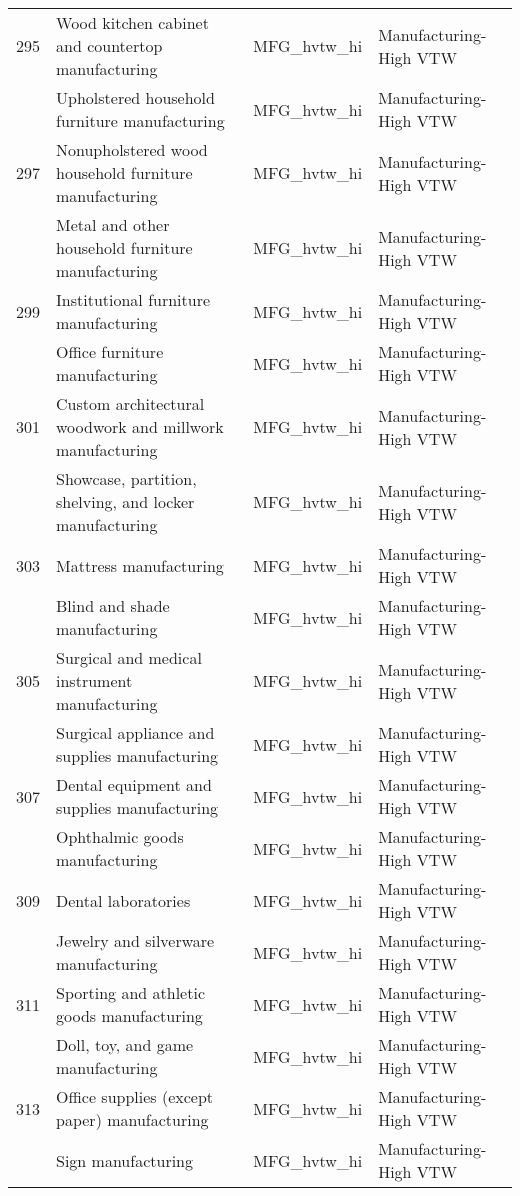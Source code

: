 \begin{landscape}
\begin{small}
\begin{longtable}{clll}
295 & Wood kitchen cabinet and countertop manufacturing & MFG\_hvtw\_hi & Manufacturing-High VTW \\
\gray 296 & Upholstered household furniture manufacturing & MFG\_hvtw\_hi & Manufacturing-High VTW \\
297 & Nonupholstered wood household furniture manufacturing & MFG\_hvtw\_hi & Manufacturing-High VTW \\
\gray 298 & Metal and other household furniture manufacturing & MFG\_hvtw\_hi & Manufacturing-High VTW \\
299 & Institutional furniture manufacturing & MFG\_hvtw\_hi & Manufacturing-High VTW \\
\gray 300 & Office furniture manufacturing & MFG\_hvtw\_hi & Manufacturing-High VTW \\
301 & Custom architectural woodwork and millwork manufacturing & MFG\_hvtw\_hi & Manufacturing-High VTW \\
\gray 302 & Showcase, partition, shelving, and locker manufacturing & MFG\_hvtw\_hi & Manufacturing-High VTW \\
303 & Mattress manufacturing & MFG\_hvtw\_hi & Manufacturing-High VTW \\
\gray 304 & Blind and shade manufacturing & MFG\_hvtw\_hi & Manufacturing-High VTW \\
305 & Surgical and medical instrument manufacturing & MFG\_hvtw\_hi & Manufacturing-High VTW \\
\gray 306 & Surgical appliance and supplies manufacturing & MFG\_hvtw\_hi & Manufacturing-High VTW \\
307 & Dental equipment and supplies manufacturing & MFG\_hvtw\_hi & Manufacturing-High VTW \\
\gray 308 & Ophthalmic goods manufacturing & MFG\_hvtw\_hi & Manufacturing-High VTW \\
309 & Dental laboratories & MFG\_hvtw\_hi & Manufacturing-High VTW \\
\gray 310 & Jewelry and silverware manufacturing & MFG\_hvtw\_hi & Manufacturing-High VTW \\
311 & Sporting and athletic goods manufacturing & MFG\_hvtw\_hi & Manufacturing-High VTW \\
\gray 312 & Doll, toy, and game manufacturing & MFG\_hvtw\_hi & Manufacturing-High VTW \\
313 & Office supplies (except paper) manufacturing & MFG\_hvtw\_hi & Manufacturing-High VTW \\
\gray 314 & Sign manufacturing & MFG\_hvtw\_hi & Manufacturing-High VTW \\

\end{longtable}
\end{small}
\end{landscape}
